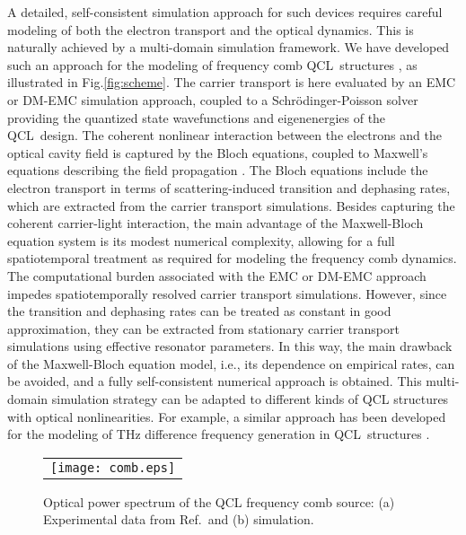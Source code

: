 \documentclass[a4paper]{spie}%
\begin{document}
A detailed, self-consistent simulation approach for such devices requires
careful modeling of both the electron transport and the optical dynamics. This
is naturally achieved by a multi-domain simulation framework. We have
developed such an approach for the modeling of frequency comb QCL\ structures
\cite{tzenov2016time}, as illustrated in Fig.\thinspace\ref{fig:scheme}. The
carrier transport is here evaluated by an EMC or DM-EMC simulation approach,
coupled to a Schr\"{o}dinger-Poisson solver providing the quantized state
wavefunctions and eigenenergies of the QCL\ design. The coherent nonlinear
interaction between the electrons and the optical cavity field is captured by
the Bloch equations, coupled to Maxwell's equations describing the field
propagation \cite{2007PhRvA..75c1802W}. The Bloch equations include the
electron transport in terms of scattering-induced transition and dephasing
rates, which are extracted from the carrier transport simulations. Besides
capturing the coherent carrier-light interaction, the main advantage of the
Maxwell-Bloch equation system is its modest numerical complexity, allowing for
a full spatiotemporal treatment as required for modeling the frequency comb
dynamics. The computational burden associated with the EMC or DM-EMC approach
impedes spatiotemporally resolved carrier transport simulations. However,
since the transition and dephasing rates can be treated as constant in good
approximation, they can be extracted from stationary carrier transport
simulations using effective resonator parameters. In this way, the main
drawback of the Maxwell-Bloch equation model, i.e., its dependence on
empirical rates, can be avoided, and a fully self-consistent numerical
approach is obtained. This multi-domain simulation strategy can be adapted to
different kinds of QCL structures with optical nonlinearities. For example, a
similar approach has been developed for the modeling of THz difference
frequency generation in QCL\ structures
\cite{jirauschek2013monte,jirauschek2015monte}.

\begin{figure}[th]
\begin{center}%
\begin{tabular}
[c]{c}%
\texttt{[image: comb.eps]}%
\end{tabular}
\end{center}
\caption[example]{Optical power spectrum of the QCL frequency comb source: (a)
Experimental data from Ref.$\,$ and (b)
simulation.}%
\label{fig:comb}%
\end{figure}
\end{document}
